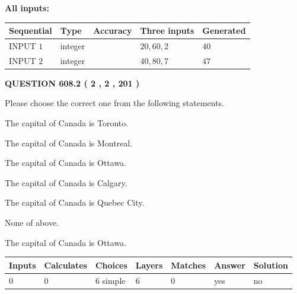 \documentclass[12pt]{article}
\begin{document}
   
   
   
\noindent\vspace{0.1in}\hspace{-0.08in} {\textbf{\Large{All inputs: }}}
   
   
  
  
\noindent\begin{tabular}{|l|l|l|l|l|}
\hline
 Sequential & Type & Accuracy & Three inputs & Generated \\ 
\hline
 
 
  INPUT $  1 $ & integer &  & $
 20
 , 
 60
 , 
 2
 $ & $ 40 $ 
 \\  \hline  
 
 
  INPUT $  2 $ & integer &  & $
 40
 , 
 80
 , 
 7
 $ & $ 47 $ 
 \\  \hline  
 \end{tabular}
   
   
  
\vspace{0.2in}
  
{\textbf{\Large{QUESTION
608.2 
 ( 2 , 2 , 201 )
}}}
  
  
Please choose the correct one from the following statements.
 
 
The capital of Canada is Toronto.
 
 
The capital of Canada is Montreal.
 
 
The capital of Canada is Ottawa.
 
 
The capital of Canada is Calgary.
 
 
The capital of Canada is Quebec City.
 
 
 None of above.
 
 
\noindent{}
 
 
The capital of Canada is Ottawa.
 
 
\noindent{}
 
 
   
   
   
   
\noindent\begin{tabular}{|l|l|l|l|l|l|l|}
 \hline
Inputs & Calculates & Choices & Layers & Matches & Answer & Solution \\ \hline
 0  & 
 0  & 
 6
  simple  
  & 
 6  & 
 0  & 
  yes & 
  no 
  \\ \hline
 \end{tabular}
   
\end{document}
